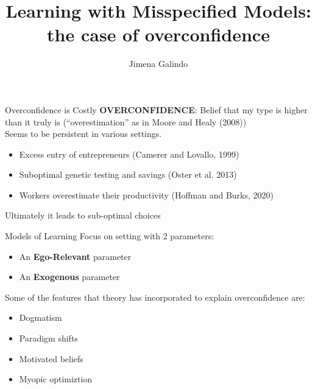 \documentclass[aspectratio=169]{beamer}
\title{Learning with Misspecified Models:\\  
the case of overconfidence}
\author{Jimena Galindo}
\begin{document}
\frame{\titlepage}

\begin{frame}{Overconfidence is Costly}
    \textbf{OVERCONFIDENCE}: Belief that my type is higher than it truly is (``overestimation'' as in Moore and Healy (2008))\\
    \bigskip
    \pause
    Seems to be persistent in various settings. 
    \begin{itemize} 
        \item Excess entry of entrepreneurs (Camerer and Lovallo, 1999)
        \item Suboptimal genetic testing and savings (Oster et al. 2013)
        \item  Workers overestimate their productivity (Hoffman and Burks, 2020)
    \end{itemize}
    \bigskip
    \alert{Ultimately it leads to sub-optimal choices}
    
\end{frame}

\begin{frame}{Models of Learning}
    Focus on setting with 2 parameters:
    \begin{itemize}
        \item An \alert{\textbf{Ego-Relevant}} parameter
        \item An \alert{\textbf{Exogenous}} parameter
    \end{itemize}
    \bigskip
    Some of the features that theory has incorporated to explain overconfidence are:
    \begin{itemize}
        \item Dogmatism
        \item Paradigm shifts
        \item Motivated beliefs
        \item Myopic optimiztion
    \end{itemize}
\end{frame}
\end{document}
